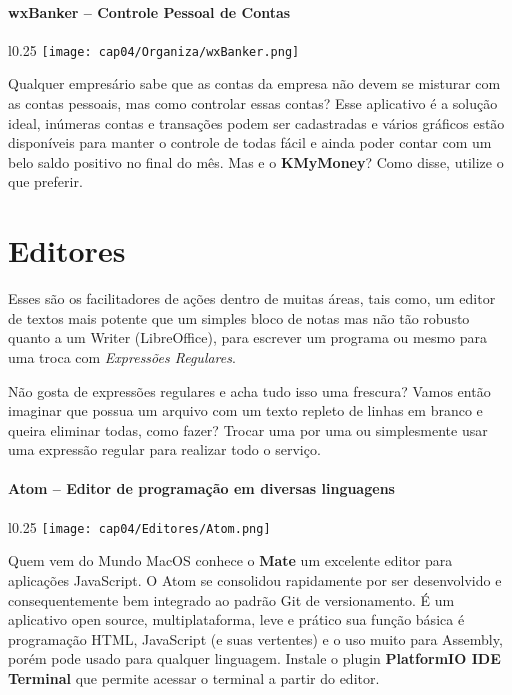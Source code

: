 \paragraph{wxBanker – Controle Pessoal de Contas}
\begin{minipage}{\linewidth}
 \vspace{5pt}
 \begin{wrapfigure}{l}{0.25\textwidth}
  \vspace{-\baselineskip}
  \texttt{[image: cap04/Organiza/wxBanker.png]}
 \end{wrapfigure}
 Qualquer empresário sabe que as contas da empresa não devem se misturar com as contas pessoais, mas como controlar essas contas? Esse aplicativo é a solução ideal, inúmeras contas e transações podem ser cadastradas e vários gráficos estão disponíveis para manter o controle de todas fácil e ainda poder contar com um belo saldo positivo no final do mês. Mas e o \textbf{KMyMoney}? Como disse, utilize o que preferir.
\end{minipage}

\section{Editores}
Esses são os facilitadores de ações dentro de muitas áreas, tais como, um editor de textos mais potente que um simples bloco de notas mas não tão robusto quanto a um Writer (LibreOffice), para escrever um programa ou mesmo para uma troca com \textit{Expressões Regulares}.

Não gosta de expressões regulares e acha tudo isso uma frescura? Vamos então imaginar que possua um arquivo com um texto repleto de linhas em branco e queira eliminar todas, como fazer? Trocar uma por uma ou simplesmente usar uma expressão regular para realizar todo o serviço.

\paragraph{Atom – Editor de programação em diversas linguagens}
\begin{minipage}{\linewidth}
 \vspace{5pt}
 \begin{wrapfigure}{l}{0.25\textwidth}
  \vspace{-\baselineskip}
  \texttt{[image: cap04/Editores/Atom.png]} 
 \end{wrapfigure}
 Quem vem do Mundo MacOS conhece o \textbf{Mate} um excelente editor para aplicações JavaScript.  O Atom se consolidou rapidamente por ser desenvolvido e consequentemente bem integrado ao padrão Git de versionamento. É um aplicativo open source, multiplataforma, leve e prático sua função básica é programação HTML, JavaScript (e suas vertentes) e o uso muito para Assembly, porém pode usado para qualquer linguagem. Instale o plugin \textbf{PlatformIO IDE Terminal} que permite acessar o terminal a partir do editor.
\end{minipage}

